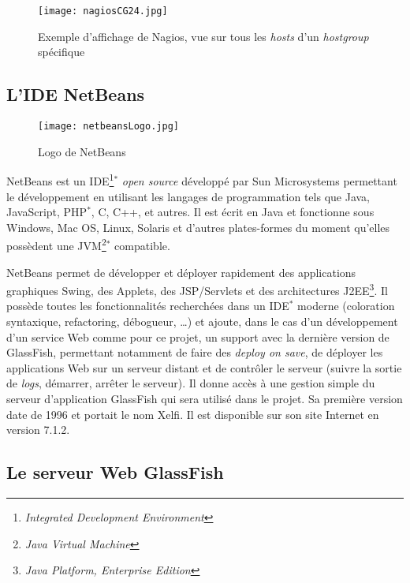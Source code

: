 \begin{figure}[!ht]
	\centering
	\texttt{[image: nagiosCG24.jpg]}
	\caption{Exemple d'affichage de Nagios, vue sur tous les \textit{hosts} d'un \textit{hostgroup} sp\'ecifique}
	\label{figure:nagiosCG24}
	
\end{figure}

\subsection{L'IDE NetBeans}
\label{section:netbeans}

\begin{figure}[!ht]
	\centering
	\texttt{[image: netbeansLogo.jpg]}
	\caption{Logo de NetBeans}

\end{figure}

NetBeans est un IDE\protect\footnote{\textit{Integrated Development Environment}}$^*$ \textit{open source} d\'evelopp\'e par Sun Microsystems permettant le d\'eveloppement en utilisant les langages de programmation tels que Java, JavaScript, PHP$^*$, C, C++, et autres.
Il est \'ecrit en Java et fonctionne sous Windows, Mac OS, Linux, Solaris et d'autres plates-formes du moment qu'elles poss\`edent une JVM\protect\footnote{\textit{Java Virtual Machine}}$^*$ compatible.

NetBeans permet de d\'evelopper et d\'eployer rapidement des applications graphiques Swing, des Applets, des JSP/Servlets et des architectures J2EE\protect\footnote{\textit{Java Platform, Enterprise Edition}}.
Il poss\`ede toutes les fonctionnalit\'es recherch\'ees dans un IDE$^*$ moderne (coloration syntaxique, refactoring, d\'ebogueur, \ldots) et ajoute, dans le cas d'un d\'eveloppement d'un service Web comme pour ce projet, un support avec la derni\`ere version de GlassFish, permettant notamment de faire des {\og}\textit{deploy on save}{\fg}, de d\'eployer les applications Web sur un serveur distant et de contr\^oler le serveur (suivre la sortie de \textit{logs}, d\'emarrer, arr\^eter le serveur). 
Il donne acc\`es \`a une gestion simple du serveur d'application GlassFish qui sera utilis\'e dans le projet.
Sa premi\`ere version date de 1996 et portait le nom Xelfi. 
Il est disponible sur son site Internet\cite{biblio:siteNetbeans} en version 7.1.2.

\subsection{Le serveur Web GlassFish}
\label{section:glassfish}

